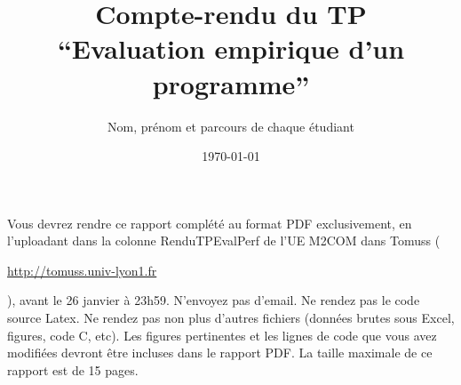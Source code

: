 \documentclass[a4paper,11pt]{article}
\let\urlorig\url
\renewcommand{\url}[1] {%
	\begin{otherlanguage}{english}\urlorig{#1}\end{otherlanguage}%
}
\begin{document}
\title{Compte-rendu du TP \\``Evaluation empirique d'un programme''}
\author{Nom, prénom et parcours de chaque étudiant}
\date{\today}
\maketitle

\tableofcontents
\newpage

Vous devrez rendre ce rapport complété au format PDF exclusivement, en l'uploadant dans la colonne RenduTPEvalPerf de l'UE M2COM dans Tomuss (\url{http://tomuss.univ-lyon1.fr}), avant le 26 janvier à 23h59. N'envoyez pas d'email. Ne rendez pas le code source Latex. Ne rendez pas non plus d'autres fichiers (données brutes sous Excel, figures, code C, etc). Les figures pertinentes et les lignes de code que vous avez modifiées devront être incluses dans le rapport PDF. La taille maximale de ce rapport est de 15 pages.







\end{document}
